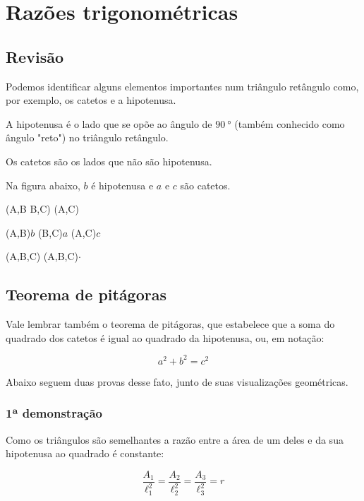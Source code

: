 \chapter{Razões trigonométricas}

\section{Revisão}

Podemos identificar alguns elementos importantes num triângulo retângulo como, por exemplo, os catetos e a hipotenusa.

A hipotenusa é o lado que se opõe ao ângulo de $\SI{90}{\degree}$ (também conhecido como ângulo "reto") no triângulo retângulo.

Os catetos são os lados que não são hipotenusa.

Na figura abaixo, \textcolor{red!80}{$b$} é hipotenusa e \textcolor{blue!80}{$a$} e \textcolor{blue!80}{$c$} são catetos.

\begin{tikzscale}[0.8]
	\tkzDrawSegments[blue](A,B B,C)
	\tkzDrawSegment[red](A,C)

	\tkzLabelSegment[below=2pt, xshift=3pt, blue](A,B){$b$}
	\tkzLabelSegment[right=2pt, yshift=-2pt, blue](B,C){$a$}
	(A,C){$c$}

	\tkzMarkRightAngle[line width=0.3pt](A,B,C)
	\tkzLabelAngle[pos=0.15](A,B,C){\small$\cdot$}

\end{tikzscale}

\section{Teorema de pitágoras}

\noindent Vale lembrar também o teorema de pitágoras, que estabelece que a soma do quadrado dos catetos é igual ao quadrado da hipotenusa, ou, em notação:

$$
	a^2+b^2=c^2
$$

Abaixo seguem duas provas desse fato, junto de suas visualizações geométricas.

\subsection{1ª demonstração}

\begin{multicols}{2}
	\noindent Como os triângulos são semelhantes a razão entre a área de um deles e da sua hipotenusa ao quadrado é constante:

	$$\frac{A_1}{\ell_1^2}=\frac{A_2}{\ell_2^2}=\frac{A_3}{\ell_3^2}=r$$

	
\end{multicols}

